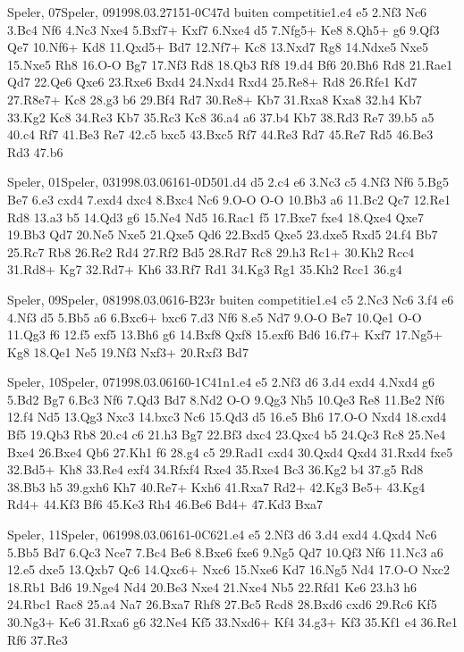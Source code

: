 \documentclass[twocolumn,a4paper,10pt]{report}
\begin{document}
\begin{chessgame}{Speler, 07}{Speler, 09}{1998.03.27}{15}{1-0}{C47d buiten competitie}{1.e4 e5 2.Nf3 Nc6 3.Bc4 Nf6 4.Nc3 Nxe4 5.Bxf7+ Kxf7 6.Nxe4 d5 7.Nfg5+ Ke8 8.Qh5+ g6 9.Qf3 Qe7 10.Nf6+ Kd8 11.Qxd5+ Bd7 12.Nf7+ Kc8 13.Nxd7 Rg8 14.Ndxe5 Nxe5 15.Nxe5 Rh8 16.O-O Bg7 17.Nf3 Rd8 18.Qb3 Rf8 19.d4 Bf6 20.Bh6 Rd8 21.Rae1 Qd7 22.Qe6 Qxe6 23.Rxe6 Bxd4 24.Nxd4 Rxd4 25.Re8+ Rd8 26.Rfe1 Kd7 27.R8e7+ Kc8 28.g3 b6 29.Bf4 Rd7 30.Re8+ Kb7 31.Rxa8 Kxa8 32.h4 Kb7 33.Kg2 Kc8 34.Re3 Kb7 35.Rc3 Kc8 36.a4 a6 37.b4 Kb7 38.Rd3 Re7 39.b5 a5 40.c4 Rf7 41.Be3 Re7 42.c5 bxc5 43.Bxc5 Rf7 44.Re3 Rd7 45.Re7 Rd5 46.Be3 Rd3 47.b6}\end{chessgame}
\begin{chessgame}{Speler, 01}{Speler, 03}{1998.03.06}{16}{1-0}{D50}{1.d4 d5 2.c4 e6 3.Nc3 c5 4.Nf3 Nf6 5.Bg5 Be7 6.e3 cxd4 7.exd4 dxc4 8.Bxc4 Nc6 9.O-O O-O 10.Bb3 a6 11.Bc2 Qc7 12.Re1 Rd8 13.a3 b5 14.Qd3 g6 15.Ne4 Nd5 16.Rac1 f5 17.Bxe7 fxe4 18.Qxe4 Qxe7 19.Bb3 Qd7 20.Ne5 Nxe5 21.Qxe5 Qd6 22.Bxd5 Qxe5 23.dxe5 Rxd5 24.f4 Bb7 25.Rc7 Rb8 26.Re2 Rd4 27.Rf2 Bd5 28.Rd7 Rc8 29.h3 Rc1+ 30.Kh2 Rcc4 31.Rd8+ Kg7 32.Rd7+ Kh6 33.Rf7 Rd1 34.Kg3 Rg1 35.Kh2 Rcc1 36.g4}\end{chessgame}
\begin{chessgame}{Speler, 09}{Speler, 08}{1998.03.06}{16}{\textonehalf-\textonehalf}{B23r buiten competitie}{1.e4 c5 2.Nc3 Nc6 3.f4 e6 4.Nf3 d5 5.Bb5 a6 6.Bxc6+ bxc6 7.d3 Nf6 8.e5 Nd7 9.O-O Be7 10.Qe1 O-O 11.Qg3 f6 12.f5 exf5 13.Bh6 g6 14.Bxf8 Qxf8 15.exf6 Bd6 16.f7+ Kxf7 17.Ng5+ Kg8 18.Qe1 Ne5 19.Nf3 Nxf3+ 20.Rxf3 Bd7}\end{chessgame}
\begin{chessgame}{Speler, 10}{Speler, 07}{1998.03.06}{16}{0-1}{C41n}{1.e4 e5 2.Nf3 d6 3.d4 exd4 4.Nxd4 g6 5.Bd2 Bg7 6.Bc3 Nf6 7.Qd3 Bd7 8.Nd2 O-O 9.Qg3 Nh5 10.Qe3 Re8 11.Be2 Nf6 12.f4 Nd5 13.Qg3 Nxc3 14.bxc3 Nc6 15.Qd3 d5 16.e5 Bh6 17.O-O Nxd4 18.cxd4 Bf5 19.Qb3 Rb8 20.c4 c6 21.h3 Bg7 22.Bf3 dxc4 23.Qxc4 b5 24.Qc3 Rc8 25.Ne4 Bxe4 26.Bxe4 Qb6 27.Kh1 f6 28.g4 c5 29.Rad1 cxd4 30.Qxd4 Qxd4 31.Rxd4 fxe5 32.Bd5+ Kh8 33.Re4 exf4 34.Rfxf4 Rxe4 35.Rxe4 Bc3 36.Kg2 b4 37.g5 Rd8 38.Bb3 h5 39.gxh6 Kh7 40.Re7+ Kxh6 41.Rxa7 Rd2+ 42.Kg3 Be5+ 43.Kg4 Rd4+ 44.Kf3 Bf6 45.Ke3 Rh4 46.Be6 Bd4+ 47.Kd3 Bxa7}\end{chessgame}
\begin{chessgame}{Speler, 11}{Speler, 06}{1998.03.06}{16}{1-0}{C62}{1.e4 e5 2.Nf3 d6 3.d4 exd4 4.Qxd4 Nc6 5.Bb5 Bd7 6.Qc3 Nce7 7.Bc4 Be6 8.Bxe6 fxe6 9.Ng5 Qd7 10.Qf3 Nf6 11.Nc3 a6 12.e5 dxe5 13.Qxb7 Qc6 14.Qxc6+ Nxc6 15.Nxe6 Kd7 16.Ng5 Nd4 17.O-O Nxc2 18.Rb1 Bd6 19.Nge4 Nd4 20.Be3 Nxe4 21.Nxe4 Nb5 22.Rfd1 Ke6 23.h3 h6 24.Rbc1 Rac8 25.a4 Na7 26.Bxa7 Rhf8 27.Bc5 Rcd8 28.Bxd6 cxd6 29.Rc6 Kf5 30.Ng3+ Ke6 31.Rxa6 g6 32.Ne4 Kf5 33.Nxd6+ Kf4 34.g3+ Kf3 35.Kf1 e4 36.Re1 Rf6 37.Re3\mate}\end{chessgame}
\end{document}
